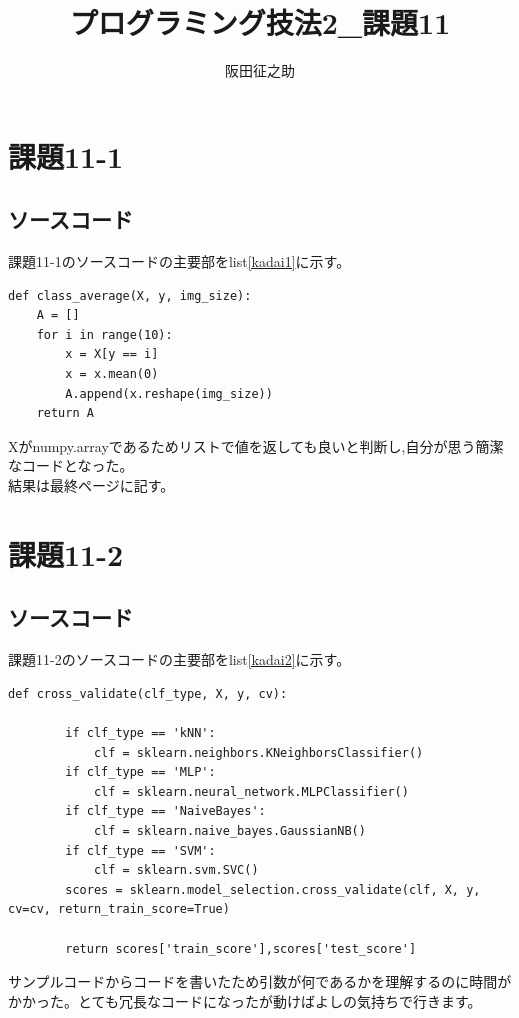 \documentclass[a4paper]{ltjsarticle}
\begin{document}
\title{プログラミング技法2\_課題11}
\author{阪田征之助}
\maketitle
\newpage
\section*{課題11-1}
\subsection*{ソースコード}
課題11-1のソースコードの主要部をlist\ref{kadai1}に示す。

\begin{lstlisting}[caption=kadai11-1.py,label=kadai1]
    def class_average(X, y, img_size):
    A = []
    for i in range(10):
        x = X[y == i]
        x = x.mean(0)
        A.append(x.reshape(img_size))
    return A
\end{lstlisting}
Xがnumpy.arrayであるためリストで値を返しても良いと判断し,自分が思う簡潔なコードとなった。
\\結果は最終ページに記す。

\newpage

\section*{課題11-2}
\subsection*{ソースコード}
課題11-2のソースコードの主要部をlist\ref{kadai2}に示す。
\begin{lstlisting}[caption=kadai11-2.py,label=kadai2]
    def cross_validate(clf_type, X, y, cv):

        if clf_type == 'kNN':
            clf = sklearn.neighbors.KNeighborsClassifier()
        if clf_type == 'MLP':
            clf = sklearn.neural_network.MLPClassifier()
        if clf_type == 'NaiveBayes':
            clf = sklearn.naive_bayes.GaussianNB()
        if clf_type == 'SVM':
            clf = sklearn.svm.SVC()
        scores = sklearn.model_selection.cross_validate(clf, X, y, cv=cv, return_train_score=True)
    
        return scores['train_score'],scores['test_score']
\end{lstlisting}
サンプルコードからコードを書いたため引数が何であるかを理解するのに時間がかかった。とても冗長なコードになったが動けばよしの気持ちで行きます。
\end{document}
